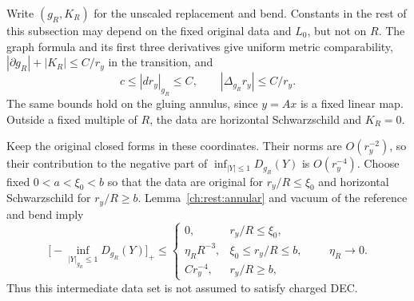 Write $(g_R,K_R)$ for the unscaled replacement and bend. Constants in
the rest of this subsection may depend on the fixed original data and
$L_0$, but not on $R$. The graph formula and its first three derivatives
give uniform metric comparability, $|\partial g_R|+|K_R|\le C/r_y$ in
the transition, and
\begin{equation}
 \label{ch:rest:radial-geometry}
 c\le|dr_y|_{g_R}\le C,\qquad
 |\Delta_{g_R}r_y|\le C/r_y.
\end{equation}
The same bounds hold on the gluing annulus, since $y=Ax$ is a fixed
linear map. Outside a fixed multiple of $R$, the data are horizontal
Schwarzschild and $K_R=0$.

Keep the original closed forms in these coordinates. Their norms are
$O(r_y^{-2})$, so their contribution to the negative part of
$\inf_{|Y|\le1}D_{g_R}(Y)$ is $O(r_y^{-4})$. Choose fixed
$0<a<\xi_0<b$ so that the data are original for $r_y/R\le\xi_0$
and horizontal Schwarzschild for $r_y/R\ge b$.
Lemma~\ref{ch:rest:annular} and vacuum of the reference and bend imply
\begin{equation}
 \label{ch:rest:charged-deficit}
 \bigl[-\inf_{|Y|_{g_R}\le1}D_{g_R}(Y)\bigr]_+
 \le
 \begin{cases}
 0,& r_y/R\le\xi_0,\\
 \eta_R R^{-3},&\xi_0\le r_y/R\le b,\\
 Cr_y^{-4},&r_y/R\ge b,
 \end{cases}
 \qquad\eta_R\longrightarrow0.
\end{equation}
Thus this intermediate data set is not assumed to satisfy charged DEC.

